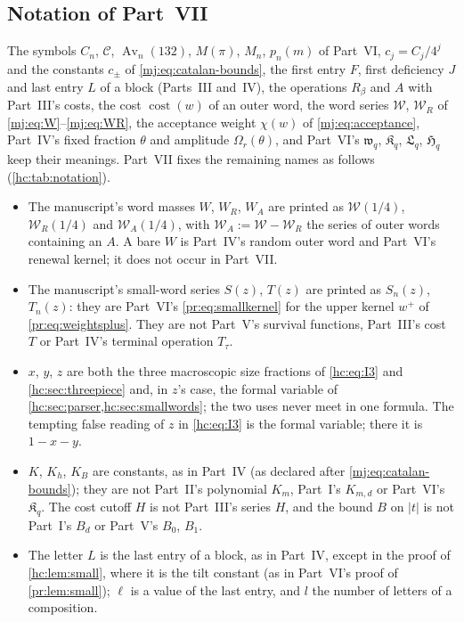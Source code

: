 \documentclass[11pt,a4paper]{article}
\theoremstyle{definition}\newaliascnt{definition}{theorem}
\theoremstyle{remark}\newaliascnt{remark}{theorem}
\newcommand{\Av}{\operatorname{Av}}
\newcommand{\Cat}{\mathcal C}
\newcommand{\ljcost}{\operatorname{cost}}
\begin{document}
\subsection{Notation of Part~VII}
\label{hc:sec:notation}
The symbols $C_n$, $\Cat$, $\Av_n(132)$, $M(\pi)$, $M_n$, $p_n(m)$ of
Part~VI, $c_j=C_j/4^j$ and the constants $c_\pm$ of
\eqref{mj:eq:catalan-bounds}, the first entry $F$, first deficiency $J$ and
last entry $L$ of a block (Parts~III and~IV), the operations $R_\beta$ and
$A$ with Part~III's costs, the cost $\ljcost(w)$ of an outer word, the word
series $\mathcal W$, $\mathcal W_R$ of \eqref{mj:eq:W}--\eqref{mj:eq:WR},
the acceptance weight $\chi(w)$ of \eqref{mj:eq:acceptance}, Part~IV's
fixed fraction $\theta$ and amplitude $\Omega_r(\theta)$, and Part~VI's
$\mathfrak w_q$, $\mathfrak K_q$, $\mathfrak L_q$, $\mathfrak H_q$ keep their
meanings. Part~VII fixes the remaining names as follows
(\cref{hc:tab:notation}).
\begin{itemize}
\item The manuscript's word masses $W$, $W_R$, $W_A$ are printed as
 $\mathcal W(1/4)$, $\mathcal W_R(1/4)$ and $\mathcal W_A(1/4)$, with
 $\mathcal W_A:=\mathcal W-\mathcal W_R$ the series of outer words containing
 an $A$. A bare $W$ is Part~IV's random outer word and Part~VI's renewal
 kernel; it does not occur in Part~VII.
\item The manuscript's small-word series $S(z)$, $T(z)$ are printed as
 $S_n(z)$, $T_n(z)$: they are Part~VI's \eqref{pr:eq:smallkernel} for the
 upper kernel $w^+$ of \eqref{pr:eq:weightsplus}. They are not Part~V's
 survival functions, Part~III's cost $T$ or Part~IV's terminal operation
 $T_\tau$.
\item $x$, $y$, $z$ are both the three macroscopic size fractions of
 \eqref{hc:eq:I3} and \cref{hc:sec:threepiece} and, in $z$'s case, the formal
 variable of \cref{hc:sec:parser,hc:sec:smallwords}; the two uses never meet
 in one formula. The tempting false reading of $z$ in \eqref{hc:eq:I3} is
 the formal variable; there it is $1-x-y$.
\item $K$, $K_h$, $K_B$ are constants, as in Part~IV
 (as declared after \eqref{mj:eq:catalan-bounds}); they are not Part~II's polynomial $K_m$,
 Part~I's $K_{m,d}$ or Part~VI's $\mathfrak K_q$. The cost cutoff $H$ is not
 Part~III's series $H$, and the bound $B$ on $|t|$ is not Part~I's $B_d$ or
 Part~V's $B_0$, $B_1$.
\item The letter $L$ is the last entry of a block, as in Part~IV, except in
 the proof of \cref{hc:lem:small}, where it is the tilt constant (as in
 Part~VI's proof of \cref{pr:lem:small}); $\ell$ is a value of the last
 entry, and $l$ the number of letters of a composition.
\end{itemize}
\end{document}
